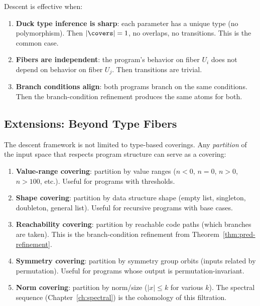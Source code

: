 \begin{theorem}
\label{thm:effective-descent}
Descent is effective when:
\begin{enumerate}
  \item \textbf{Duck type inference is sharp}: each parameter has
    a unique type (no polymorphism).  Then $|\covers| = 1$, no
    overlaps, no transitions.  This is the common case.
  \item \textbf{Fibers are independent}: the program's behavior on
    fiber $U_i$ does not depend on behavior on fiber $U_j$.  Then
    transitions are trivial.
  \item \textbf{Branch conditions align}: both programs branch on
    the same conditions.  Then the branch-condition refinement
    produces the same atoms for both.
\end{enumerate}
\end{theorem}

\subsection{Extensions: Beyond Type Fibers}

The descent framework is not limited to type-based coverings.  Any
\emph{partition} of the input space that respects program structure
can serve as a covering:

\begin{enumerate}
  \item \textbf{Value-range covering}: partition by value ranges
    ($n < 0$, $n = 0$, $n > 0$, $n > 100$, etc.).  Useful for
    programs with thresholds.
  \item \textbf{Shape covering}: partition by data structure shape
    (empty list, singleton, doubleton, general list).  Useful for
    recursive programs with base cases.
  \item \textbf{Reachability covering}: partition by reachable
    code paths (which branches are taken).  This is the
    branch-condition refinement from Theorem~\ref{thm:pred-refinement}.
  \item \textbf{Symmetry covering}: partition by symmetry group
    orbits (inputs related by permutation).  Useful for programs
    whose output is permutation-invariant.
  \item \textbf{Norm covering}: partition by norm/size ($|x| \leq k$
    for various $k$).  The spectral sequence
    (Chapter~\ref{ch:spectral}) is the cohomology of this filtration.
\end{enumerate}

